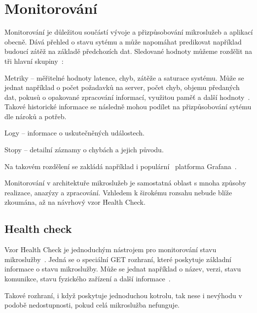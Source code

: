\section{Monitorování}\label{sec:msa-monitoring}

Monitorování je důležitou součástí vývoje a přizpůsobování mikroslužeb a aplikací obecně.
Dává přehled o stavu sytému a může napomáhat predikovat například budoucí zátěž na základě předchozích dat.
Sledované hodnoty můžeme rozdělit na tři hlavní skupiny~\cite{msactions}:

\begin{dl}
   \item [Metriky] – měřitelné hodnoty latence, chyb, zátěže a saturace systému.
   Může se jednat například o počet požadavků na server, počet chyb, objemu předaných dat, pokusů o opakované zpracování informací, využitou paměť a další hodnoty~\cite{msactions}.
   Takové historické informace se následně mohou podílet na přizpůsobování sytému dle nároků a potřeb.
   \item [Logy] – informace o uskutečněných událostech.
   \item [Stopy] – detailní záznamy o chybách a jejich původu.
\end{dl}

Na takovém rozdělení se zakládá například i populární~\cite{grafanapop} platforma Grafana~\cite{grafana}.

Monitorování v architektuře mikroslužeb je samostatná oblast s mnoha způsoby realizace, anazýzy a zpracování.
Vzhledem k širokému rozsahu nebude blíže zkoumána, až na návrhový vzor \h{Health Check}.


\subsection{Health check}\label{subsec:msa-monitoring-healthcheck}

Vzor \h{Health Check} je jednoduchým nástrojem pro monitorování stavu mikroslužby~\cite{healthcheck}.
Jedná se o speciální  GET rozhraní, které poskytuje základní informace o stavu mikroslužby.
Může se jednat například o název, verzi, stavu komunikce, stavu fyzického zařízení a další informace~\cite{healthcheck}.

Takové rozhraní, i když poskytuje jednoduchou kotrolu, tak nese i nevýhodu v podobě nedostupnosti, pokud celá mikroslužba nefunguje.
